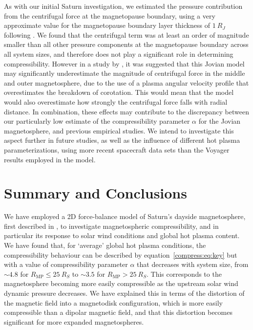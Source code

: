 As with our initial Saturn investigation, we estimated the pressure contribution from the centrifugal force at the magnetopause boundary, using a very approximate value for the magnetopause boundary layer thickness of $\SI{1}{R_J}$ following \citet{delamere2010}. We found that the centrifugal term was at least an order of magnitude smaller than all other pressure components at the magnetopause boundary across all system sizes, and therefore does not play a significant role in determining compressibility. However in a study by \citet{nichols2011}, it was suggested that this Jovian model may significantly underestimate the magnitude of centrifugal force in the middle and outer magnetosphere, due to the use of a plasma angular velocity profile that overestimates the breakdown of corotation. This would mean that the model would also overestimate how strongly the centrifugal force falls with radial distance. In combination, these effects may contribute to the discrepancy between our particularly low estimate of the compressibility parameter $\alpha$ for the Jovian magnetosphere, and previous empirical studies. We intend to investigate this aspect further in future studies, as well as the influence of different hot plasma parameterizations, using more recent spacecraft data sets than the Voyager results employed in the \citet{caudal1986} model.

\section{Summary and Conclusions}
We have employed a 2D force-balance model of Saturn's dayside magnetosphere, first described in \citet{achilleos2010a}, to investigate magnetospheric compressibility, and in particular its response to solar wind conditions and global hot plasma content. We have found that, for `average' global hot plasma conditions, the compressibility behaviour can be described by equation~\ref{compress:eq:key} but with a value of compressibility parameter $\alpha$ that decreases with system size, from ${\sim}4.8$ for $R_\mathrm{MP} \leq \SI{25}{R_S}$ to ${\sim}3.5$ for $R_\mathrm{MP} > \SI{25}{R_S}$. This corresponds to the magnetosphere becoming more easily compressible as the upstream solar wind dynamic pressure decreases. We have explained this in terms of the distortion of the magnetic field into a magnetodisk configuration, which is more easily compressible than a dipolar magnetic field, and that this distortion becomes significant for more expanded magnetospheres. 

